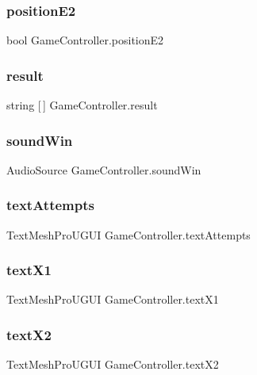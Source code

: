 \subsubsection{positionE2}
{\footnotesize\ttfamily bool Game\+Controller.\+position\+E2}

\mbox{\label{class_game_controller_ab8f039dc0b898da4afa8a87b63c4b1ea}} 
\subsubsection{result}
{\footnotesize\ttfamily string [$\,$] Game\+Controller.\+result}

\mbox{\label{class_game_controller_ad32c9e632fa13db91444312b3ed76dbf}} 
\subsubsection{soundWin}
{\footnotesize\ttfamily Audio\+Source Game\+Controller.\+sound\+Win}

\mbox{\label{class_game_controller_a28e1db2bf1d348d75a6980f5198dde19}} 
\subsubsection{textAttempts}
{\footnotesize\ttfamily Text\+Mesh\+Pro\+U\+G\+UI Game\+Controller.\+text\+Attempts}

\mbox{\label{class_game_controller_a7ef9db0d76479916e6c367b7e5358854}} 
\subsubsection{textX1}
{\footnotesize\ttfamily Text\+Mesh\+Pro\+U\+G\+UI Game\+Controller.\+text\+X1}

\mbox{\label{class_game_controller_a2fda68e6b5c58ca6f2551f432803d0ba}} 
\subsubsection{textX2}
{\footnotesize\ttfamily Text\+Mesh\+Pro\+U\+G\+UI Game\+Controller.\+text\+X2}

